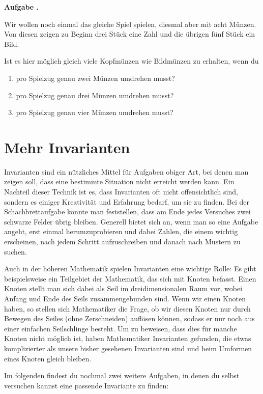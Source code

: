 \documentclass[a4paper,ngerman,12pt]{scrartcl}
\theoremstyle{definition}
\theoremstyle{plain}
\theoremstyle{remark}
\newlength{\aufgabenskip}
\newcounter{aufgabennummer}
\newenvironment{aufgabe}[1]{
	\addtocounter{aufgabennummer}{1}
	\textbf{Aufgabe \theaufgabennummer.} \emph{#1} \par
}{\vspace{\aufgabenskip}}
\begin{document}
\begin{aufgabe}{}
	Wir wollen noch einmal das gleiche Spiel spielen, diesmal aber mit acht Münzen. Von diesen zeigen zu Beginn drei Stück eine Zahl und die übrigen fünf Stück ein Bild.
	
	Ist es hier möglich gleich viele Kopfmünzen wie Bildmünzen zu erhalten, wenn du
	\begin{enumerate}
		\item pro Spielzug genau zwei Münzen umdrehen musst?
		\item pro Spielzug genau drei Münzen umdrehen musst?
		\item pro Spielzug genau vier Münzen umdrehen musst?
	\end{enumerate}
\end{aufgabe}


\section{Mehr Invarianten}

Invarianten sind ein nützliches Mittel für Aufgaben obiger Art, bei denen man zeigen soll, dass eine bestimmte Situation nicht erreicht werden kann. Ein Nachteil dieser Technik ist es, dass Invarianten oft nicht offensichtlich sind, sondern es einiger Kreativität und Erfahrung bedarf, um sie zu finden. Bei der Schachbrettaufgabe könnte man feststellen, dass am Ende jedes Versuches zwei schwarze Felder übrig bleiben. Generell bietet sich an, wenn man so eine Aufgabe angeht, erst einmal herumzuprobieren und dabei Zahlen, die einem wichtig erscheinen, nach jedem Schritt aufzuschreiben und danach nach Mustern zu suchen.

Auch in der höheren Mathematik spielen Invarianten eine wichtige Rolle: Es gibt beispielsweise ein Teilgebiet der Mathematik, das sich mit Knoten befasst. Einen Knoten stellt man sich dabei als Seil im dreidimensionalen Raum vor, wobei Anfang und Ende des Seils zusammengebunden sind. Wenn wir einen Knoten haben, so stellen sich Mathematiker die Frage, ob wir diesen Knoten nur durch Bewegen des Seiles (ohne Zerschneiden) auflösen können, sodass er nur noch aus einer einfachen Seilschlinge besteht. Um zu beweisen, dass dies für manche Knoten nicht möglich ist, haben Mathematiker Invarianten gefunden, die etwas komplizierter als unsere bisher gesehenen Invarianten sind und beim Umformen eines Knoten gleich bleiben.

Im folgenden findest du nochmal zwei weitere Aufgaben, in denen du selbst versuchen kannst eine passende Invariante zu finden:
\end{document}
